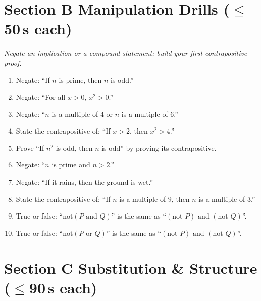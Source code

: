 \documentclass[11pt,a4paper]{article}
\begin{document}
\section*{Section B \quad Manipulation Drills \hfill{\normalfont\small($\leq$50\,s each)}}

\noindent\textit{Negate an implication or a compound statement; build your first contrapositive proof.}

\begin{enumerate}

\item Negate: ``If $n$ is prime, then $n$ is odd.''

\item Negate: ``For all $x>0$, $x^2>0$.''

\item Negate: ``$n$ is a multiple of $4$ or $n$ is a multiple of $6$.''

\item State the contrapositive of: ``If $x>2$, then $x^2>4$.''

\item Prove ``If $n^2$ is odd, then $n$ is odd'' by proving its contrapositive.

\item Negate: ``$n$ is prime and $n>2$.''

\item Negate: ``If it rains, then the ground is wet.''

\item State the contrapositive of: ``If $n$ is a multiple of $9$, then $n$ is a multiple of $3$.''

\item True or false: ``$\text{not}(P \text{ and } Q)$'' is the same as ``$(\text{not } P) \text{ and } (\text{not } Q)$''.

\item True or false: ``$\text{not}(P \text{ or } Q)$'' is the same as ``$(\text{not } P) \text{ and } (\text{not } Q)$''.

\end{enumerate}

\section*{Section C \quad Substitution \& Structure \hfill{\normalfont\small($\leq$90\,s each)}}
\end{document}
